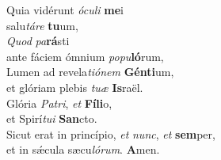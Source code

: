\evenverse Quia vidérunt \textit{ó}\textit{cu}\textit{li} \textbf{me}i~\*\\
\evenverse salu\textit{tá}\textit{re} \textbf{tu}um,\\
\oddverse \textit{Quod} \textit{pa}\textbf{rá}sti~\*\\
\oddverse ante fáciem ómnium \textit{po}\textit{pu}\textbf{ló}rum,\\
\evenverse Lumen ad revela\textit{ti}\textit{ó}\textit{nem} \textbf{Gén}\textbf{ti}um,~\*\\
\evenverse et glóriam plebis \textit{tu}\textit{æ} \textbf{Is}raël.\\
\oddverse Glória \textit{Pa}\textit{tri}, \textit{et} \textbf{Fí}\textbf{li}o,~\*\\
\oddverse et Spirí\textit{tu}\textit{i} \textbf{San}cto.\\
\evenverse Sicut erat in princípio, \textit{et} \textit{nunc}, \textit{et} \textbf{sem}per,~\*\\
\evenverse et in sǽcula sæcu\textit{ló}\textit{rum}. \textbf{A}men.\\
